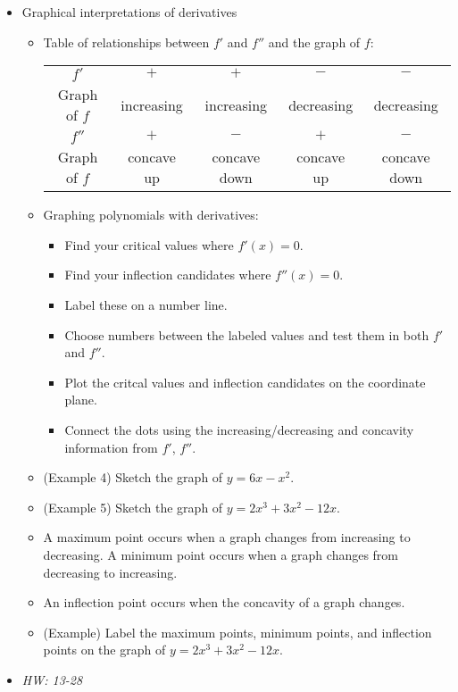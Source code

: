 \documentclass[11pt]{article}
\begin{document}
\begin{itemize}
\item Graphical interpretations of derivatives
  \begin{itemize}
    \item Table of relationships between \(f'\) and \(f''\) and the graph
          of \(f\): \\
      \begin{tabular}{c|c|c|c|c}
        \(f'\) & \(+\) & \(+\) & \(-\) & \(-\) \\
        Graph of \(f\) & increasing & increasing & decreasing & decreasing \\
        \(f''\) & \(+\) & \(-\) & \(+\) & \(-\) \\
        Graph of \(f\) & concave up & concave down & concave up & concave down
      \end{tabular}
    \item Graphing polynomials with derivatives:
      \begin{itemize}
        \item Find your critical values where \(f'(x)=0\).
        \item Find your inflection candidates where \(f''(x)=0\).
        \item Label these on a number line.
        \item Choose numbers between the labeled values and test them in
              both \(f'\) and \(f''\).
        \item Plot the critcal values and inflection candidates on the
              coordinate plane.
        \item Connect the dots using the increasing/decreasing and concavity
              information from \(f'\), \(f''\).
      \end{itemize}
    \item (Example 4) Sketch the graph of \(y=6x-x^2\).
    \item (Example 5) Sketch the graph of \(y=2x^3+3x^2-12x\).
    \item A maximum point occurs when a graph changes from increasing to
          decreasing. A minimum point occurs when a graph changes from
          decreasing to increasing.
    \item An inflection point occurs when the concavity of a graph
          changes.
    \item (Example) Label the maximum points, minimum points, and inflection
          points on the graph of \(y=2x^3+3x^2-12x\).
  \end{itemize}
\item\textit{
  HW: 13-28
}
\end{itemize}
\end{document}
